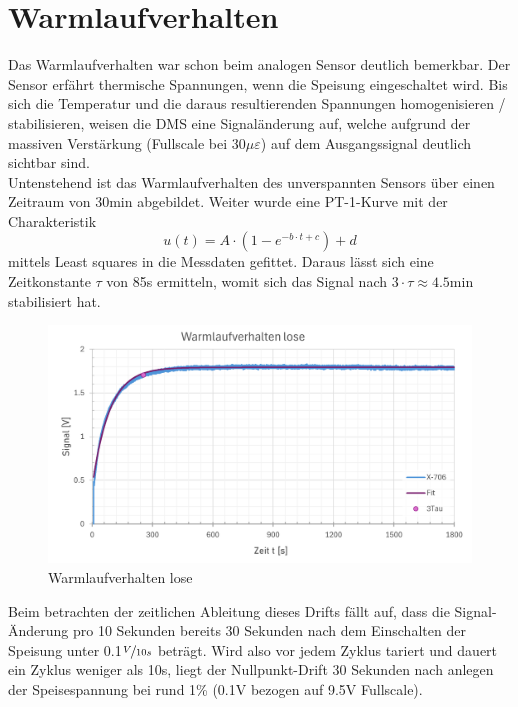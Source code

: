 \documentclass[12pt,a4paper]{article}
\begin{document}
	\section{Warmlaufverhalten}
	Das Warmlaufverhalten war schon beim analogen Sensor deutlich bemerkbar. Der Sensor erfährt thermische Spannungen, wenn die Speisung eingeschaltet wird. Bis sich die Temperatur und die daraus resultierenden Spannungen homogenisieren / stabilisieren, weisen die DMS eine Signaländerung auf, welche aufgrund der massiven Verstärkung (Fullscale bei 30$\mu\varepsilon$) auf dem Ausgangssignal deutlich sichtbar sind.\\
	Untenstehend ist das Warmlaufverhalten des unverspannten Sensors über einen Zeitraum von 30min abgebildet. Weiter wurde eine PT-1-Kurve mit der Charakteristik
	\begin{equation}
		u(t) = A\cdot(1-e^{-b\cdot t + c})+d
	\end{equation}
	mittels Least squares in die Messdaten gefittet. Daraus lässt sich eine Zeitkonstante $\tau$ von 85s ermitteln, womit sich das Signal nach $3\cdot \tau \approx 4.5$min stabilisiert hat.
	\begin{figure}[H]
		\centering
		\includegraphics[width=1\linewidth]{Imgs/Warmlaufen_lose}
		\caption[Warmlaufverhalten lose]{Warmlaufverhalten lose}
		\label{fig:warmlaufenlose}
	\end{figure}\noindent
	Beim betrachten der zeitlichen Ableitung dieses Drifts fällt auf, dass die Signal-Änderung pro 10 Sekunden bereits 30 Sekunden nach dem Einschalten der Speisung unter 0.1$\nicefrac{V}{10s}$ beträgt. Wird also vor jedem Zyklus tariert und dauert ein Zyklus weniger als 10s, liegt der Nullpunkt-Drift 30 Sekunden nach anlegen der Speisespannung bei rund 1\% (0.1V bezogen auf 9.5V Fullscale).
\end{document}

